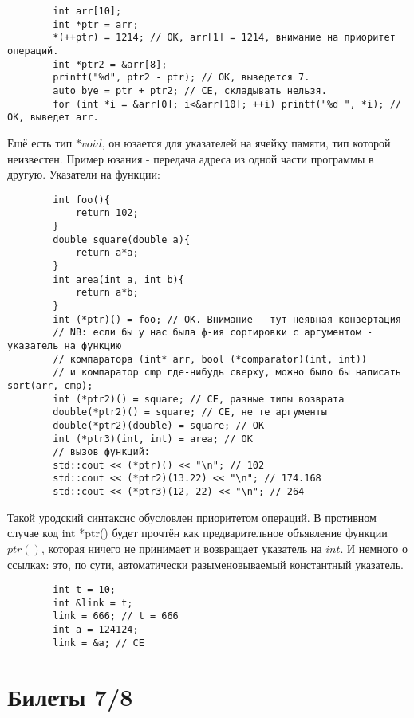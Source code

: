 \documentclass[15pt, a4paper]{article}
\newcommand{\nl}{\newline}
\begin{document}
    \begin{verbatim}
        int arr[10];
        int *ptr = arr;
        *(++ptr) = 1214; // OK, arr[1] = 1214, внимание на приоритет операций.
        int *ptr2 = &arr[8];
        printf("%d", ptr2 - ptr); // OK, выведется 7.
        auto bye = ptr + ptr2; // CE, складывать нельзя.
        for (int *i = &arr[0]; i<&arr[10]; ++i) printf("%d ", *i); // OK, выведет arr.
    \end{verbatim}
    Ещё есть тип $*void$, он юзается для указателей на ячейку памяти, тип которой неизвестен. Пример юзания - передача адреса из одной части программы в другую. \nl
    Указатели на функции:
    \begin{verbatim}
        int foo(){
            return 102;
        }
        double square(double a){
            return a*a;
        }    
        int area(int a, int b){
            return a*b;
        }
        int (*ptr)() = foo; // OK. Внимание - тут неявная конвертация
        // NB: если бы у нас была ф-ия сортировки с аргументом - указатель на функцию 
        // компаратора (int* arr, bool (*comparator)(int, int))
        // и компаратор cmp где-нибудь сверху, можно было бы написать sort(arr, cmp);
        int (*ptr2)() = square; // CE, разные типы возврата
        double(*ptr2)() = square; // CE, не те аргументы
        double(*ptr2)(double) = square; // OK
        int (*ptr3)(int, int) = area; // OK
        // вызов функций:
        std::cout << (*ptr)() << "\n"; // 102
        std::cout << (*ptr2)(13.22) << "\n"; // 174.168
        std::cout << (*ptr3)(12, 22) << "\n"; // 264
    \end{verbatim}
    Такой уродский синтаксис обусловлен приоритетом операций. В противном случае код int *ptr() будет прочтён как предварительное объявление
    функции $ptr()$, которая ничего не принимает и возвращает указатель на $int$. \nl
    И немного о ссылках: это, по сути, автоматически разыменовываемый константный указатель.
    \begin{verbatim}
        int t = 10;
        int &link = t;
        link = 666; // t = 666
        int a = 124124;
        link = &a; // CE
    \end{verbatim}
    \newpage

    \section{Билеты 7/8}
\end{document}
